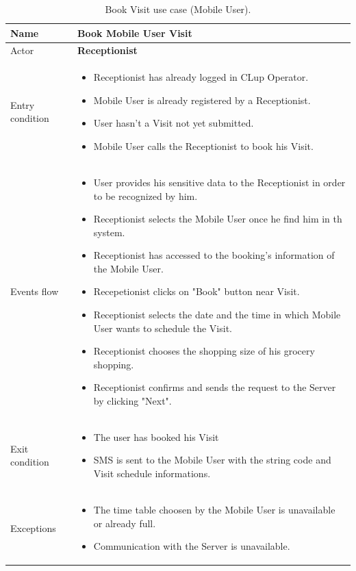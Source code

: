 \begin{table}[H]\begin{tabular}{|p{5cm} | p{7cm} | }
	\hline
	Name & \textbf{Book Mobile User Visit}  \\
	\hline
	Actor & \textbf{Receptionist} \\
	\hline
	Entry condition &
	\begin{itemize}
		\item Receptionist has already logged in CLup Operator. 
 		\item Mobile User is already registered by a Receptionist.
		\item User hasn't a Visit not yet submitted. 
        \item Mobile User calls the Receptionist to book his Visit.
	\end{itemize} \\
	\hline
	Events flow & 
	\begin{itemize}
		\item User provides his sensitive data to the Receptionist in order to be recognized by him. 
        \item Receptionist selects the Mobile User once he find him in th system.
		\item Receptionist has accessed to the booking's information of the Mobile User.
        \item Recepetionist clicks on "Book" button near Visit.
		\item Receptionist selects the date and the time in which Mobile User wants to schedule the Visit.
		\item Receptionist chooses the shopping size of his grocery shopping.
		\item Receptionist confirms and sends the request to the Server by clicking "Next".
	\end{itemize} \\
	\hline
	Exit condition & \begin{itemize}
	\item The user has booked his Visit
    \item SMS is sent to the Mobile User with the string code and Visit schedule informations. 
    \end{itemize}\\
	\hline 
	Exceptions & 
	\begin{itemize}
    \item The time table choosen by the Mobile User is unavailable or already full.
    \item Communication with the Server is unavailable.
    \end{itemize} \\
	\hline
\end{tabular}
\caption{Book Visit use case (Mobile User).}
\end{table}
\bigbreak

